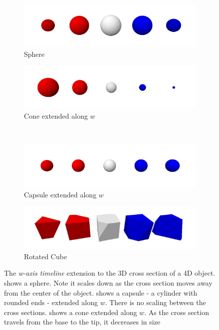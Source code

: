 \documentclass{l4proj}
\begin{document}
\begin{figure}[H]
  \begin{subfigure}[b]{0.45\textwidth}
    \includegraphics[width=\textwidth]{images/representations/timeline-sphere.png}
    \caption{Sphere}
    \label{fig:rep_timeline-sphere}
  \end{subfigure}
  \begin{subfigure}[b]{0.45\textwidth}
    \includegraphics[width=\textwidth]{images/representations/timeline-cone.png}
    \caption{Cone extended along $w$}
    \label{fig:rep_timeline-cone}
  \end{subfigure}
  \\
  \begin{subfigure}[b]{0.45\textwidth}
    \includegraphics[width=\textwidth]{images/representations/timeline-capsule.png}
    \caption{Capsule extended along $w$}
    \label{fig:rep_timeline-capsule}
  \end{subfigure}
  \begin{subfigure}[b]{0.45\textwidth}
    \includegraphics[width=\textwidth]{images/representations/timeline-cube.png}
    \caption{Rotated Cube}
    \label{fig:rep_timeline-cube}
  \end{subfigure}
  \caption{
    The \emph{w-axis timeline} extension to the 3D cross section of a 4D object.
     shows a sphere. Note it scales down as the cross section moves away from the center of the object.
     shows a capsule - a cylinder with rounded ends - extended along $w$. There is no scaling between the cross sections.
     shows a cone extended along $w$. As the cross section travels from the base to the tip, it decreases in size
    }
  \label{fig:rep_timeline}
\end{figure}
\end{document}
